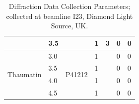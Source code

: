 \begin{table}[h]
{\begin{tabular}{@{}lllllll@{}}
 &
  3.5 &
   &
  1 &
  3 &
  0 &
  0 \\ \midrule
\multirow{4}{*}{Thaumatin} &
  3.0 &
  \multirow{4}{*}{P41212} &
  1 &
   &
  0 &
  0 \\
 &
  3.5 &
   &
  1 &
   &
  0 &
  0 \\
 &
  4.0 &
   &
  1 &
   &
  0 &
  0 \\
 &
  4.5 &
   &
  1 &
   &
  0 &
  0 \\ \bottomrule
\end{tabular}%
}
\caption{Diffraction Data Collection Parameters; collected at beamline I23, Diamond Light Source, UK.}
\label{diffration_table}
\end{table}








